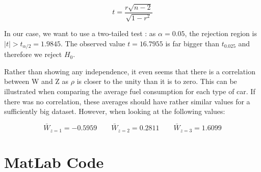 \documentclass[a4paper]{article}
\begin{document}
\begin{enumerate}[(a)]
$$t = \frac{r\sqrt{n-2}}{\sqrt{1-r^2}}$$

In our case, we want to use a two-tailed test : as $\alpha = 0.05$, the rejection region is $|t|>t_{\alpha/2} = 1.9845$. The observed value $t=16.7955$ is far bigger than $t_{0.025}$ and therefore we reject $H_0$. 

Rather than showing any independence, it even seems that there is a correlation between W and Z as $\rho$ is closer to the unity than it is to zero. This can be illustrated when comparing the average fuel consumption for each type of car. If there was no correlation, these averages should have rather similar values for a sufficiently big dataset. However, when looking at the following values:

$$\bar{W}_{z=1} = -0.5959 \qquad \bar{W}_{z=2} = 0.2811 \qquad \bar{W}_{z=3} = 1.6099$$

\end{enumerate}


\newpage

\appendix

\section{MatLab Code}
\end{document}
